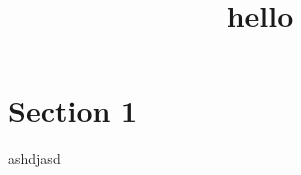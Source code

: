 \documentclass[11pt,a4paper,]{article}
\begin{document}
\title{hello}
\maketitle
\section{Section 1}
ashdjasd
\end{document}
